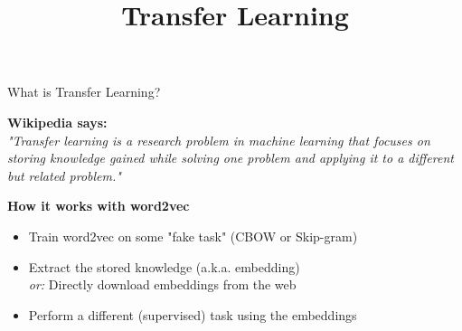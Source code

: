 



\newcommand{\titlefigure}{figure/transfer_learning_taxonomy-1.png}
\newcommand{\learninggoals}{
\item Differentiate the different flavors of transfer learning
\item Understand the challenges we might be able to overcome by using transfer learning}

\title{Transfer Learning}
\date{}




\begin{frame}{What is Transfer Learning?}

\vfill

	\textbf{Wikipedia says:} \\
    \textit{"Transfer learning is a research problem in machine learning that focuses on storing knowledge gained while solving one problem and applying it to a different but related problem."}\\
		
	\vspace{.5cm}
	
	\textbf{How it works with word2vec}
	
	\begin{itemize}
		\item Train word2vec on some "fake task" (CBOW or Skip-gram)
		\item Extract the stored knowledge (a.k.a. embedding)\\
					\textit{or:} Directly download embeddings from the web 
		\item Perform a different (supervised) task using the embeddings
	\end{itemize}
	
\vfill

\end{frame}


